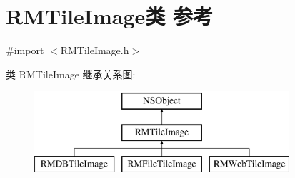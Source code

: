 \hypertarget{interface_r_m_tile_image}{\section{R\-M\-Tile\-Image类 参考}
\label{interface_r_m_tile_image}
}


{\ttfamily \#import $<$R\-M\-Tile\-Image.\-h$>$}

类 R\-M\-Tile\-Image 继承关系图\-:\begin{figure}[H]
\begin{center}
\leavevmode
\includegraphics[height=3.000000cm]{interface_r_m_tile_image}
\end{center}
\end{figure}

